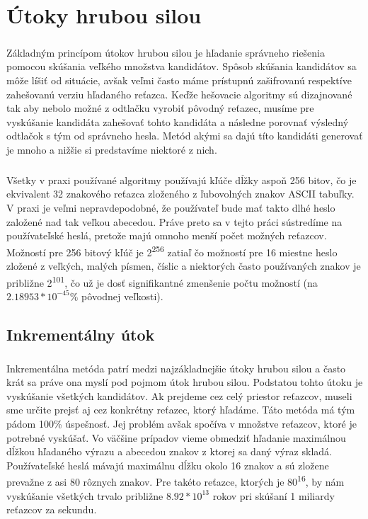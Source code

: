 \chapter{Útoky hrubou silou}
\paragraph{}
Základným princípom útokov hrubou silou je hľadanie správneho riešenia pomocou skúšania veľkého množstva kandidátov. Spôsob skúšania kandidátov sa môže líšiť od situácie, avšak veľmi často máme prístupnú zašifrovanú respektíve zahešovanú verziu hľadaného reťazca. Keďže hešovacie algoritmy sú dizajnované tak aby nebolo možné z odtlačku vyrobiť pôvodný reťazec, musíme pre vyskúšanie kandidáta zahešovať tohto kandidáta a následne porovnať výsledný odtlačok s tým od správneho hesla. Metód akými sa dajú títo kandidáti generovať je mnoho a nižšie si predstavíme niektoré z nich.

\paragraph{}
Všetky v praxi používané algoritmy používajú kľúče dĺžky aspoň 256 bitov, čo je ekvivalent 32 znakového reťazca zloženého z ľubovolných znakov ASCII tabuľky. V praxi je veľmi nepravdepodobné, že používateľ bude mať takto dlhé heslo založené nad tak veľkou abecedou. Práve preto sa v tejto práci sústredíme na používateľské heslá, pretože majú omnoho menší počet možných reťazcov. Možností pre 256 bitový kľúč je 2\textsuperscript{256} zatiaľ čo možností pre 16 miestne heslo zložené z veľkých, malých písmen, číslic a niektorých často používaných znakov je približne 2\textsuperscript{101}, čo už je dosť signifikantné zmenšenie počtu možností (na \(2.18953*10^{-45} \%\) pôvodnej veľkosti).

\section{Inkrementálny útok}
\paragraph{}
Inkrementálna metóda patrí medzi najzákladnejšie útoky hrubou silou a často krát sa práve ona myslí pod pojmom útok hrubou silou. Podstatou tohto útoku je vyskúšanie všetkých kandidátov. Ak prejdeme cez celý priestor reťazcov, museli sme určite prejsť aj cez konkrétny reťazec, ktorý hľadáme. Táto metóda má tým pádom 100\% úspešnosť. Jej problém avšak spočíva v množstve reťazcov, ktoré je potrebné vyskúšať. Vo väčšine prípadov vieme obmedziť hľadanie maximálnou dĺžkou hľadaného výrazu a abecedou znakov z ktorej sa daný výraz skladá. Používateľské heslá mávajú maximálnu dĺžku okolo 16 znakov a sú zložene prevažne z asi 80 rôznych znakov. Pre takéto reťazce, ktorých je 80\textsuperscript{16}, by nám vyskúšanie všetkých trvalo približne \(8.92*10^{13}\) rokov pri skúšaní 1 miliardy reťazcov za sekundu.

